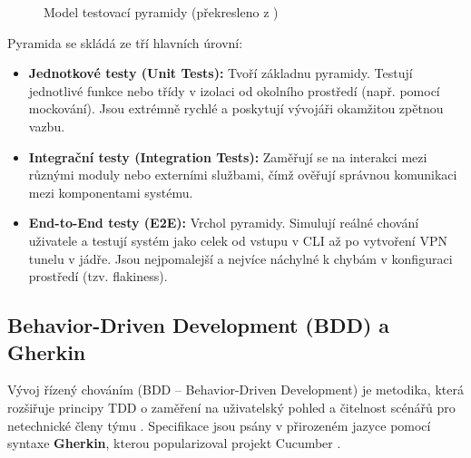 \begin{figure}[H]
    \centering
    \caption{Model testovací pyramidy (překresleno z \cite{cohn_succeeding})}
    \label{fig:test_pyramid}
\end{figure}

Pyramida se skládá ze tří hlavních úrovní:
\begin{itemize}
    \item \textbf{Jednotkové testy (Unit Tests):} Tvoří základnu pyramidy. Testují jednotlivé funkce nebo třídy v izolaci od okolního prostředí (např. pomocí mockování). Jsou extrémně rychlé a poskytují vývojáři okamžitou zpětnou vazbu.
    \item \textbf{Integrační testy (Integration Tests):} Zaměřují se na interakci mezi různými moduly nebo externími službami, čímž ověřují správnou komunikaci mezi komponentami systému.
    \item \textbf{End-to-End testy (E2E):} Vrchol pyramidy. Simulují reálné chování uživatele a testují systém jako celek od vstupu v CLI až po vytvoření VPN tunelu v jádře. Jsou nejpomalejší a nejvíce náchylné k chybám v konfiguraci prostředí (tzv. flakiness).
\end{itemize}

\subsection{Behavior-Driven Development (BDD) a Gherkin}
\label{sec:bdd_teorie}
Vývoj řízený chováním (BDD – Behavior-Driven Development) je metodika, která rozšiřuje principy TDD o zaměření na uživatelský pohled a čitelnost scénářů pro netechnické členy týmu \cite{north2006introducing}. Specifikace jsou psány v přirozeném jazyce pomocí syntaxe \textbf{Gherkin}, kterou popularizoval projekt Cucumber \cite{cucumber_gherkin}.

